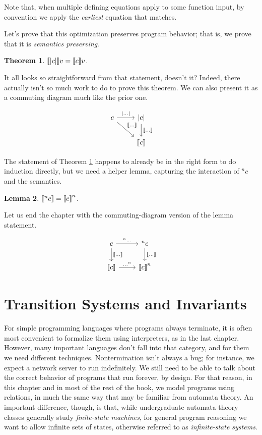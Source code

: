 \documentclass{amsbook}
\newtheorem{theorem}{Theorem}[chapter]
\newtheorem{lemma}[theorem]{Lemma}
\theoremstyle{definition}
\theoremstyle{remark}
\numberwithin{section}{chapter}
\numberwithin{equation}{chapter}
\begin{document}
Note that, when multiple defining equations apply to some function input, by convention we apply the \emph{earliest} equation that matches.

Let's prove that this optimization preserves program behavior; that is, we prove that it is \emph{semantics preserving}.

\begin{theorem}\label{unroll}
  ${\left \llbracket {\left | c \right |} \right \rrbracket}v = {\left \llbracket c \right \rrbracket}v$.
\end{theorem}

It all looks so straightforward from that statement, doesn't it?
Indeed, there actually isn't so much work to do to prove this theorem.
We can also present it as a commuting diagram much like the prior one.

\[
\begin{tikzcd}
c \arrow{r}{\opt{\ldots}} \arrow{dr}{\denote{\ldots}} & \opt{c} \arrow{d}{\denote{\ldots}} \\
& \denote{c}
\end{tikzcd}
\]

The statement of Theorem \ref{unroll} happens to already be in the right form to do induction directly, but we need a helper lemma, capturing the interaction of $^nc$ and the semantics.

\begin{lemma}
  ${\left \llbracket ^nc \right \rrbracket} = {\left \llbracket c \right \rrbracket}^n$.
\end{lemma}

Let us end the chapter with the commuting-diagram version of the lemma statement.

\[
\begin{tikzcd}
c \arrow{r}{^n\ldots} \arrow{d}{\denote{\ldots}} & ^nc \arrow{d}{\denote{\ldots}} \\
\denote{c} \arrow{r}{\ldots^n} & \denote{c}^n
\end{tikzcd}
\]



\chapter{Transition Systems and Invariants}

For simple programming languages where programs always terminate, it is often most convenient to formalize them using interpreters, as in the last chapter.
However, many important languages don't fall into that category, and for them we need different techniques.
Nontermination isn't always a bug; for instance, we expect a network server to run indefinitely.
We still need to be able to talk about the correct behavior of programs that run forever, by design.
For that reason, in this chapter and in most of the rest of the book, we model programs using relations, in much the same way that may be familiar from automata theory.
An important difference, though, is that, while undergraduate automata-theory classes generally study \emph{finite-state machines}, for general program reasoning we want to allow infinite sets of states, otherwise referred to as \emph{infinite-state systems}.
\end{document}
